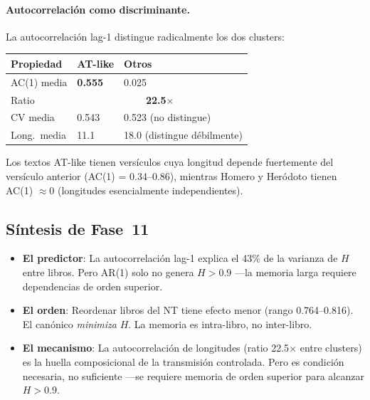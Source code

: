 \documentclass[12pt,a4paper]{article}
\newcommand{\val}[1]{\textcolor{hlcolor}{\textbf{#1}}}
\begin{document}
\paragraph{Autocorrelaci\'on como discriminante.}
La autocorrelaci\'on lag-1 distingue radicalmente los dos clusters:

\begin{center}\small
\begin{tabular}{lll}
\toprule
Propiedad & AT-like & Otros \\
\midrule
AC(1) media  & \val{0.555} & 0.025 \\
Ratio        & \multicolumn{2}{c}{\val{22.5$\times$}} \\
CV media     & 0.543       & 0.523 (no distingue) \\
Long.\ media & 11.1        & 18.0 (distingue d\'ebilmente) \\
\bottomrule
\end{tabular}
\end{center}

Los textos AT-like tienen vers\'iculos cuya longitud depende fuertemente
del vers\'iculo anterior (AC(1) = 0.34--0.86),
mientras Homero y Her\'odoto tienen AC(1) $\approx 0$
(longitudes esencialmente independientes).

\subsection{S\'intesis de Fase~11}

\begin{itemize}[leftmargin=2em]
\item \textbf{El predictor}: La autocorrelaci\'on lag-1 explica el 43\% de la
      varianza de $H$ entre libros. Pero AR(1) solo no genera $H > 0.9$
      ---la memoria larga requiere dependencias de orden superior.
\item \textbf{El orden}: Reordenar libros del NT tiene efecto menor
      (rango 0.764--0.816). El can\'onico \emph{minimiza} $H$.
      La memoria es intra-libro, no inter-libro.
\item \textbf{El mecanismo}: La autocorrelaci\'on de longitudes
      (ratio 22.5$\times$ entre clusters) es la huella composicional
      de la transmisi\'on controlada. Pero es condici\'on necesaria,
      no suficiente ---se requiere memoria de orden superior
      para alcanzar $H > 0.9$.
\end{itemize}


\end{document}

